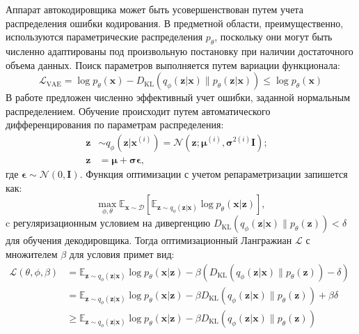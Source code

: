 Аппарат автокодировщика может быть усовершенствован путем учета распределения ошибки кодирования. В предметной области,
преимущественно, используются параметрические распределения $p_\theta$, поскольку они могут быть численно адаптированы под 
произвольную постановку при наличии достаточного объема данных. Поиск параметров выполняется путем вариации функционала:
\begin{equation}
    \mathcal{L}_\text{VAE} = \log p_\theta(\mathbf{x}) - D_\text{KL}( q_\phi(\mathbf{z}\vert\mathbf{x}) \| p_\theta(\mathbf{z}\vert\mathbf{x}) ) \leq \log p_\theta(\mathbf{x})
\end{equation}
В работе \cite{kingma2013auto} предложен численно эффективный учет ошибки, заданной нормальным распределением. Обучение происходит путем автоматического 
дифференцирования по параметрам распределения: 
\begin{equation}
    \begin{aligned}
        \mathbf{z} &\sim q_\phi(\mathbf{z}\vert\mathbf{x}^{(i)}) = \mathcal{N}(\mathbf{z}; \boldsymbol{\mu}^{(i)}, \boldsymbol{\sigma}^{2(i)}\boldsymbol{I}); & \\
        \mathbf{z} &= \boldsymbol{\mu} + \boldsymbol{\sigma} \boldsymbol{\epsilon},
    \end{aligned}
\end{equation}
где $\boldsymbol{\epsilon} \sim \mathcal{N}(0, \boldsymbol{I})$. Функция оптимизации с учетом репараметризации запишется как:
\begin{equation}
    \max_{\phi, \theta} \mathbb{E}_{\mathbf{x}\sim\mathcal{D}}[\mathbb{E}_{\mathbf{z} \sim q_\phi(\mathbf{z}\vert\mathbf{x})} \log p_\theta(\mathbf{x}\vert\mathbf{z})],
\end{equation}
c регуляризационным условием на дивергенцию $D_\text{KL}(q_\phi(\mathbf{z}\vert\mathbf{x})\|p_\theta(\mathbf{z})) < \delta$ для обучения декодировщика. 
Тогда оптимизационный Лангражиан $\mathcal{L}$ с множителем $\beta$ для условия примет вид:
\begin{equation}
    \begin{aligned}
        \mathcal{L}(\theta, \phi, \beta) &= \mathbb{E}_{\mathbf{z} \sim q_\phi(\mathbf{z}\vert\mathbf{x})} \log p_\theta(\mathbf{x}\vert\mathbf{z}) - \beta(D_\text{KL}(q_\phi(\mathbf{z}\vert\mathbf{x})\|p_\theta(\mathbf{z})) - \delta) & \\
        & = \mathbb{E}_{\mathbf{z} \sim q_\phi(\mathbf{z}\vert\mathbf{x})} \log p_\theta(\mathbf{x}\vert\mathbf{z}) - \beta D_\text{KL}(q_\phi(\mathbf{z}\vert\mathbf{x})\|p_\theta(\mathbf{z})) + \beta \delta & \\
        & \geq \mathbb{E}_{\mathbf{z} \sim q_\phi(\mathbf{z}\vert\mathbf{x})} \log p_\theta(\mathbf{x}\vert\mathbf{z}) - \beta D_\text{KL}(q_\phi(\mathbf{z}\vert\mathbf{x})\|p_\theta(\mathbf{z}))
    \end{aligned}
\end{equation}
